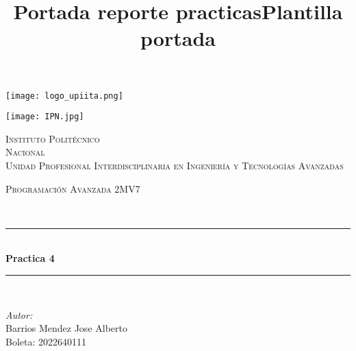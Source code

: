 \documentclass[11pt]{article}
\title{Portada reporte practicas}
\title{Plantilla portada}
\begin{document}
\begin{center}																		%
\newcommand{\HRule}{\rule{\linewidth}{0.5mm}}									%
 																					
\begin{minipage}{0.48\textwidth} \begin{flushleft}
\texttt{[image: logo\_upiita.png]}
\end{flushleft}\end{minipage}
\begin{minipage}{0.48\textwidth} \begin{flushright}
\texttt{[image: IPN.jpg]}
\end{flushright}\end{minipage}

\vspace*{-1.5cm}								%
\textsc{\huge Instituto Polit\'ecnico\\ \vspace{5px} Nacional}\\[1.5cm]	

\textsc{\LARGE Unidad Profesional Interdisciplinaria en Ingenier\'ia y				%
Tecnolog\'ias Avanzadas}\\[1.5cm]													%

\begin{minipage}{0.9\textwidth} 
\begin{center}																					%
\textsc{\LARGE Programación Avanzada 2MV7}
\end{center}
\end{minipage}\\[0.5cm]
 			\vspace*{1cm}																		%
\HRule \\[0.4cm]																	%
{ \huge \bfseries Practica 4}\\[0.4cm]	%
\HRule \\[1.5cm]																	%
\begin{minipage}{0.46\textwidth}													%
\begin{flushleft} \large															%
\emph{Autor:}\\	
Barrios Mendez Jose Alberto\\
Boleta: 2022640111



\end{flushleft}
\end{minipage}
\end{center}
\end{document}
